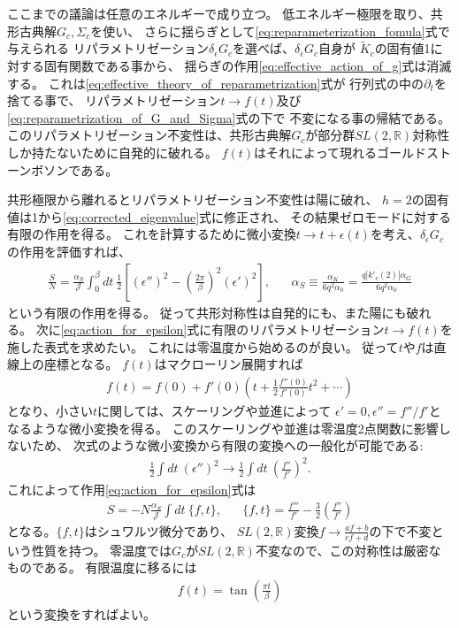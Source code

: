 ここまでの議論は任意のエネルギーで成り立つ。
低エネルギー極限を取り、共形古典解$G_c,\Sigma_c$を使い、
さらに揺らぎとして\eqref{eq:reparameterization_fomula}式で与えられる
リパラメトリゼーション$\delta_{\epsilon}G_c$を選べば、$\delta_{\epsilon}G_c$自身が
$\tilde{K}_c$の固有値1に対する固有関数である事から、
揺らぎの作用\eqref{eq:effective_action_of_g}式は消滅する。
これは\eqref{eq:effective_theory_of_reparametrization}式が
行列式の中の$\partial_t$を捨てる事で、
リパラメトリゼーション$t\to f(t)$及び\eqref{eq:reparametrization_of_G_and_Sigma}式の下で
不変になる事の帰結である。
このリパラメトリゼーション不変性は、共形古典解$G_c$が部分群$SL(2,\mathbb{R})$対称性
しか持たないために自発的に破れる。
$f(t)$はそれによって現れるゴールドストーンボソンである。

共形極限から離れるとリパラメトリゼーション不変性は陽に破れ、
$h=2$の固有値は1から\eqref{eq:corrected_eigenvalue}式に修正され、
その結果ゼロモードに対する有限の作用を得る。
これを計算するために微小変換$t\to t + \epsilon(t)$を考え、$\delta_{\epsilon}G_c$の作用を評価すれば、
\begin{align}
	\frac{S}{N} = \frac{\alpha_S}{\mathcal{J}}\int_0^{\beta}dt\ \frac{1}{2}
		\left[
			\left(\epsilon''\right)^2 - \left(\frac{2\pi}{\beta}\right)^2(\epsilon')^2
		\right],\hspace{20pt}
	\alpha_S \equiv \frac{\alpha_K}{6q^2\alpha_0} = \frac{q|k'_c(2)|\alpha_G}{6q^2\alpha_0}
	\label{eq:action_for_epsilon}
\end{align}
という有限の作用を得る。
従って共形対称性は自発的にも、また陽にも破れる。
次に\eqref{eq:action_for_epsilon}式に有限のリパラメトリゼーション$t\to f(t)$を施した表式を求めたい。
これには零温度から始めるのが良い。
従って$t$や$f$は直線上の座標となる。
$f(t)$はマクローリン展開すれば
\begin{align}
	f(t) = f(0) + f'(0)\left(t
		+ \frac{1}{2}\frac{f''(0)}{f'(0)}t^2 + \cdots
	\right)
\end{align}
となり、小さい$t$に関しては、スケーリングや並進によって
$\epsilon' = 0, \epsilon'' = f''/f'$となるような微小変換を得る。
このスケーリングや並進は零温度2点関数に影響しないため、
次式のような微小変換から有限の変換への一般化が可能である:
\begin{align}
	\frac{1}{2}\int dt\ (\epsilon'')^2 \to 
	\frac{1}{2}\int dt\ \left(\frac{f''}{f'}\right)^2.
\end{align}
これによって作用\eqref{eq:action_for_epsilon}式は
\begin{align}
	S = -N\frac{\alpha_S}{\mathcal{J}}\int dt\ \{f, t\},\hspace{20pt}
	\{f, t\} = \frac{f'''}{f'} - \frac{3}{2}\left(\frac{f''}{f'}\right)
	\label{eq:Schwartzian_action}
\end{align}
となる。$\{f,t\}$はシュワルツ微分であり、
$SL(2, \mathbb{R})$変換$f \to \frac{af + b}{cf + d}$の下で不変という性質を持つ。
零温度では$G_c$が$SL(2, \mathbb{R})$不変なので、この対称性は厳密なものである。
有限温度に移るには
\begin{align}
	f(t) = \tan\left(\frac{\pi t}{\beta}\right)
\end{align}
という変換をすればよい。

\pagebreak